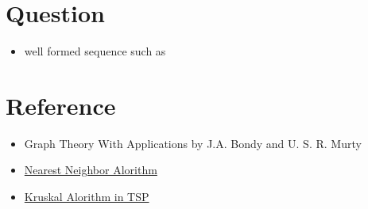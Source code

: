 \documentclass[12pt]{article}
\begin{document}
\section{Question}
\begin{itemize}
    \item well formed sequence such as
\end{itemize}

\section{Reference}
\begin{itemize}
    \item Graph Theory With Applications by J.A. Bondy and U. S. R. Murty
    \item \href{http://math.mit.edu/~goemans/18433S15/TSP-CookCPS.pdf}{Nearest Neighbor Alorithm} 
    \item \href{https://www.ams.org/journals/proc/1956-007-01/S0002-9939-1956-0078686-7/home.html}{Kruskal  Alorithm in TSP} 
\end{itemize}
\end{document}
